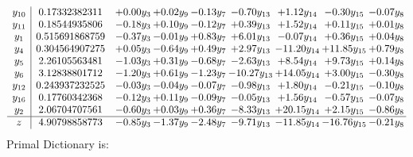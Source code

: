 \documentclass[9pt]{article}
\begin{document}
\[\begin{array}{c| c c@{\hskip 2pt} c@{\hskip 2pt} c@{\hskip 2pt} c@{\hskip 2pt} c@{\hskip 2pt} c@{\hskip 2pt} c@{\hskip 2pt} }
 y_{10}   &  0.17332382311 & +  0.00 y_{3} & +  0.02 y_{9} & -0.13 y_{7} & -0.70 y_{13} & +  1.12 y_{14} & -0.30 y_{15} & -0.07 y_{8}\\
 y_{11}   &  0.18544935806 & -0.18 y_{3} & +  0.10 y_{9} & -0.12 y_{7} & +  0.39 y_{13} & +  1.52 y_{14} & +  0.11 y_{15} & +  0.01 y_{8}\\
 y_{1}   &  0.515691868759 & -0.37 y_{3} & -0.01 y_{9} & +  0.83 y_{7} & +  6.01 y_{13} & -0.07 y_{14} & +  0.36 y_{15} & +  0.04 y_{8}\\
 y_{4}   &  0.304564907275 & +  0.05 y_{3} & -0.64 y_{9} & +  0.49 y_{7} & +  2.97 y_{13} & -11.20 y_{14} & + 11.85 y_{15} & +  0.79 y_{8}\\
 y_{5}   &  2.26105563481 & -1.03 y_{3} & +  0.31 y_{9} & -0.68 y_{7} & -2.63 y_{13} & +  8.54 y_{14} & +  9.73 y_{15} & +  0.14 y_{8}\\
 y_{6}   &  3.12838801712 & -1.20 y_{3} & +  0.61 y_{9} & -1.23 y_{7} & -10.27 y_{13} & + 14.05 y_{14} & +  3.00 y_{15} & -0.30 y_{8}\\
 y_{12}   &  0.243937232525 & -0.03 y_{3} & -0.04 y_{9} & -0.07 y_{7} & -0.98 y_{13} & +  1.80 y_{14} & -0.21 y_{15} & -0.10 y_{8}\\
 y_{16}   &  0.17760342368 & -0.12 y_{3} & +  0.11 y_{9} & -0.09 y_{7} & -0.05 y_{13} & +  1.56 y_{14} & -0.57 y_{15} & -0.07 y_{8}\\
 y_{2}   &  2.06704707561 & -0.60 y_{3} & +  0.03 y_{9} & +  0.36 y_{7} & -8.33 y_{13} & + 20.15 y_{14} & +  2.15 y_{15} & -0.86 y_{8}\\
\hline
z    &  4.90798858773 & -0.85 y_{3} & -1.37 y_{9} & -2.48 y_{7} & -9.71 y_{13} & -11.85 y_{14} & -16.76 y_{15} & -0.21 y_{8}\\
\end{array}\]
Primal Dictionary is:
\end{document}
